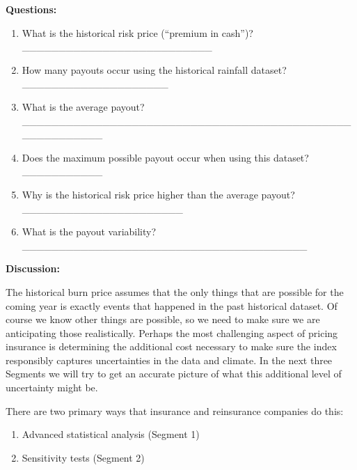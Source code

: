 \documentclass[letterpaper,10pt,english]{sphinxmanual}
\begin{document}
\textbf{Questions:}
\begin{enumerate}
\item {} 
What is the historical risk price (``premium in cash'')?\_\_\_\_\_\_\_\_\_\_\_\_\_\_\_\_\_\_\_\_\_\_\_\_\_\_

\item {} 
How many payouts occur using the historical rainfall dataset?\_\_\_\_\_\_\_\_\_\_\_\_\_\_\_\_\_\_\_\_

\item {} 
What is the average payout?\_\_\_\_\_\_\_\_\_\_\_\_\_\_\_\_\_\_\_\_\_\_\_\_\_\_\_\_\_\_\_\_\_\_\_\_\_\_\_\_\_\_\_\_\_\_\_\_\_\_\_\_\_\_\_\_

\item {} 
Does the maximum possible payout occur when using this dataset?\_\_\_\_\_\_\_\_\_\_\_

\item {} 
Why is the historical risk price higher than the average payout?\_\_\_\_\_\_\_\_\_\_\_\_\_\_\_\_\_\_\_\_\_\_

\item {} 
What is the payout variability?\_\_\_\_\_\_\_\_\_\_\_\_\_\_\_\_\_\_\_\_\_\_\_\_\_\_\_\_\_\_\_\_\_\_\_\_\_\_\_

\end{enumerate}

\textbf{Discussion:}

The historical burn price assumes that the only things that are possible for the coming year is exactly events that happened in the past historical dataset. Of course we know other things are possible, so we need to make sure we are anticipating those realistically. Perhaps the most challenging aspect of pricing insurance is determining the additional cost necessary to make sure the index responsibly captures uncertainties in the data and climate. In the next three Segments we will try to get an accurate picture of what this additional level of uncertainty might be.

There are two primary ways that insurance and reinsurance companies do this:
\begin{enumerate}
\item {} 
Advanced statistical analysis (Segment 1)

\item {} 
Sensitivity tests (Segment 2)

\end{enumerate}
\end{document}
